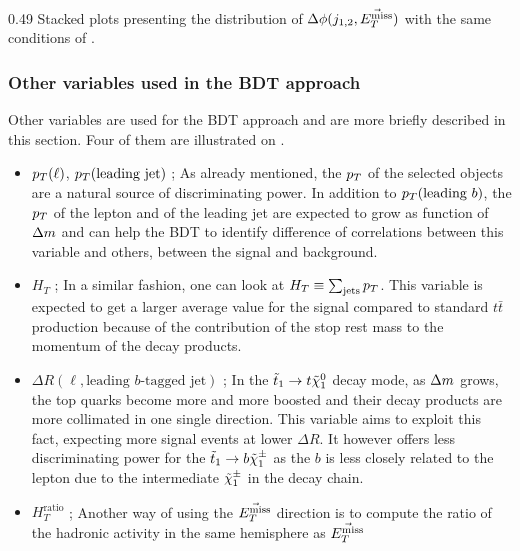                      {0.49}
                     {Stacked plots presenting the distribution of $\Delta \phi( j_{1,2}, \vec{E_T^\text{miss}} )$
                     with the same conditions of .}

        \subsubsection{Other variables used in the BDT approach}

        Other variables are used for the BDT approach and are more briefly described in
        this section. Four of them are illustrated on .

    \begin{itemize}
        \item $p_T(\ell)$, $p_T(\text{leading jet})$ ; As already mentioned, the $p_T$ of the
            selected objects are a natural source of discriminating power. In addition to
            $p_T(\text{leading }b)$, the $p_T$ of the lepton and of the leading jet are
            expected to grow as function of $\Delta m$ and can help the BDT to identify
            difference of correlations between this variable and others, between the
            signal and background.
        \item $H_T$ ; In a similar fashion, one can look at $H_T \equiv \sum_{\text{jets}} p_T$.
            This variable is expected to get a larger average value for the signal compared to standard
            $t\bar{t}$ production because of the contribution of the stop rest mass to the momentum of
            the decay products.
        \item $\Delta R( \ell, \text{leading } b\text{-tagged jet})$ ; In the $\tilde{t}_1
            \rightarrow t \tilde{\chi}_1^0$ decay mode, as $\Delta m$ grows, the top quarks become
            more and more boosted and their decay products are more collimated in one single
            direction. This variable aims to exploit this fact, expecting more signal events
            at lower $\Delta R$. It however offers less discriminating power for the $\tilde{t}_1
            \rightarrow b \tilde{\chi}_1^\pm$ as the $b$ is less closely related to the lepton due
            to the intermediate $\tilde{\chi}_1^\pm$ in the decay chain.
        \item $H_{T}^\text{ratio}$ ; Another way of using the $\vec{E_T^\text{miss}}$ direction is to
            compute the ratio of the hadronic activity in the same hemisphere as $\vec{E_T^\text{miss}}$

\end{itemize}
